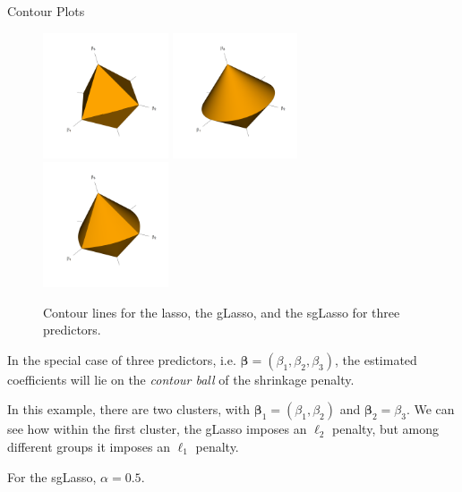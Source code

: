 \documentclass[8pt]{beamer}
\newcommand{\mydef}[1]{\textcolor{SteelBlue3}{\textit{#1}}} %
\begin{document}
\begin{frame}{Contour Plots}

\begin{figure}[ht]

\centering
\includegraphics[width = 0.33\textwidth]{3D_lasso_contour.png}
\includegraphics[width = 0.33\textwidth]{3D_glasso_contour.png}
\includegraphics[width = 0.33\textwidth]{3D_sglasso_contour.png}

\caption{Contour lines for the lasso, the gLasso, and the sgLasso for three predictors.}

\end{figure}

In the special case of three predictors, i.e. $\bm{\beta}=(\beta_1,\beta_2,\beta_3)$, the estimated coefficients will lie on the \mydef{contour ball} of the shrinkage penalty. %

In this example, there are two clusters, with $\bm{\beta}_1 = (\beta_1,\beta_2)$ and $\bm{\beta}_2 = \beta_3$. We can see how within the first cluster, the gLasso imposes an $\ell_2$ penalty, but among different groups it imposes an $\ell_1$ penalty.

For the sgLasso, $\alpha = 0.5$.
    
\end{frame}
\end{document}
